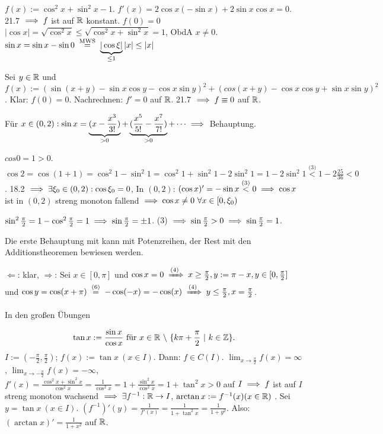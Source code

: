 \documentclass[a4paper,oneside,DIV15,BCOR12mm]{scrbook}
\begin{document}
\begin{beweise}
\item $f(x):=\cos^2 x + \sin^2 x -1$. $f'(x)=2\cos x(-\sin x)+2\sin x\cos x=0$. 21.7 $\implies f$ ist auf $\mathbb{R}$ konstant. $f(0)=0$ $|\cos x|=\sqrt{\cos^2 x} \le \sqrt{\cos^2 x + \sin^2 x}=1$, ObdA $x\ne0$. $\sin x=\sin x-\sin 0 \gleichnach{MWS} \underbrace{|\cos \xi|}_{\le 1}|x| \le |x|$
\item Sei $y \in \mathbb{R}$ und $f(x):=(\sin(x+y)-\sin x \cos y - \cos x \sin y)^2 + (cos(x+y)-\cos x \cos y + \sin x \sin y)^2$. Klar: $f(0)=0$. Nachrechnen: $f'=0$ auf $\mathbb{R}$. 21.7 $\implies f\equiv 0$ auf $\mathbb{R}$.
\item Für $x\in(0,2): \sin x = \underbrace{(x-\frac{x^3}{3!})}_{>0}+\underbrace{(\frac{x^5}{5!}-\frac{x^7}{7!})}_{>0}+\cdots \implies$ Behauptung.
\item $cos 0 = 1> 0$. $\cos 2 = \cos(1+1) = \cos^2 1 - \sin^2 1=\cos^2 1 + \sin^2 1 - 2\sin^2 1 = 1-2\sin^2 1 \overset{\text{(3)}}{<} 1-2\frac{25}{36}<0$. 18.2 $\implies \exists \xi_0 \in (0, 2): \cos \xi_0=0$, In $(0,2)$: $(\cos x)'=-\sin x \overset{\text{(3)}}{<} 0 \implies \cos x$ ist in $(0,2)$ streng monoton fallend $\folgt \cos x \ne 0 \ \forall x \in [0, \xi_0)$
\item $\sin^2\frac{\pi}{2}=1-\cos^2\frac{\pi}{2}=1\implies\sin\frac{\pi}{2}=\pm 1$. (3) $\implies\sin\frac{\pi}{2}>0\implies\sin\frac{\pi}{2}=1$.
\item Die erste Behauptung mit kann mit Potenzreihen, der Rest mit den Additionstheoremen bewiesen werden.
\item \glqq$\Leftarrow$\grqq: klar, \glqq$\Rightarrow$\grqq: Sei $x\in[0, \pi]$ und $\cos x = 0 \folgtnach{(4)} x\ge\frac{\pi}{2}, y:=\pi-x, y \in [0, \frac{\pi}{2}]$ und $\cos y=\cos(x+\pi)\gleichnach{(6)}-\cos(-x)=-\cos(x)\folgtnach{(4)}y\le\frac{\pi}{2}, x=\frac{\pi}{2}$.
\item In den großen Übungen
\end{beweise}

\begin{wichtigedefinition}[Tangens]
$$\tan x:=\frac{\sin x}{\cos x}\ \text{für}\ x \in \MdR\ \backslash\ \{k\pi+\frac{\pi}{2}\ |\ k \in \MdZ\}.$$ $I:=(-\frac{\pi}{2}, \frac{\pi}{2})$; $f(x):=\tan x\ (x\in I)$. Dann: $f\in C(I)$. $
\displaystyle\lim_{x\to\frac{\pi}{2}}{f(x)}=\infty$, $\displaystyle\lim_{x\to-\frac{\pi}{2}}{f(x)}=-\infty$, $f'(x)=\frac{\cos^2 x + \sin^2 x}{\cos^2 x}=\frac{1}{\cos^2 x}=1+\frac{\sin^2 x}{\cos^2 x}=1+\tan^2 x>0$ auf $I \implies f$ ist auf $I$ streng monoton wachsend $\implies \exists f^{-1}: \mathbb{R} \to I$, $\arctan x:=f^{-1}(x) (x \in \mathbb{R})$ . Sei $y=\tan x\ (x \in I)$. $(f^{-1})'(y)=\frac{1}{f'(x)}=\frac{1}{1+\tan^2 x}=\frac{1}{1+y^2}$. Also: $(\arctan x)'=\frac{1}{1+x^2}$ auf $\mathbb{R}$.
\end{wichtigedefinition}
\end{document}
